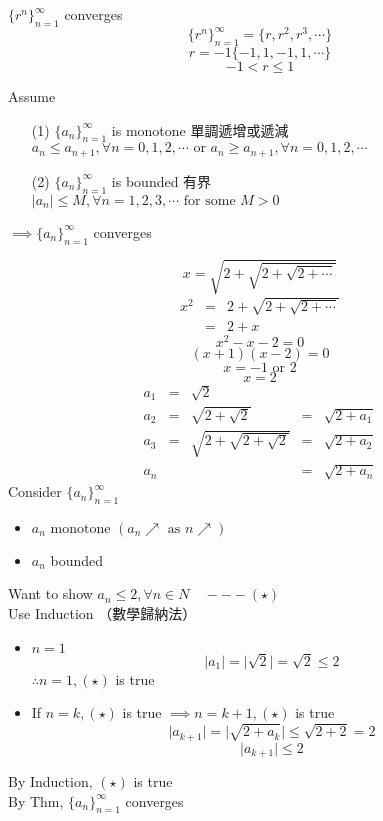 \begin{eg}
\(\{r^n\}^{\infty}_{n = 1}\) converges
\[\{r^n\}^{\infty}_{n = 1} = \{r, r^2, r^3, \cdots\}\]
\[r = -1 \{-1, 1, -1, 1, \cdots\}\]
\[-1 < r \leq 1\]
\end{eg}
\begin{theorem}
Assume
\begin{itemize}
\item[(1)] \(\{a_n\}^{\infty}_{n = 1}\) is monotone 單調遞增或遞減\\
\(a_n \leq a_{n + 1}, \forall n = 0, 1, 2, \cdots \text{ or } a_n \geq a_{n + 1}, \forall n = 0, 1, 2, \cdots\)
\item[(2)]\(\{a_n\}^{\infty}_{n = 1}\) is bounded 有界\\
\(\Big| a_n \Big| \leq M, \forall n = 1, 2, 3, \cdots \text{ for some } M > 0\)
\end{itemize}
\(\implies \{a_n\}^{\infty}_{n = 1}\) converges
\end{theorem}
\begin{eg}
\[x = \sqrt{2+ \sqrt{2+ \sqrt{2 + \cdots}}}\]
\[\begin{array}{rcl}
x^2 & = & 2 + \sqrt{2 + \sqrt{2 + \cdots}}\\
& = & 2 + x
\end{array}\]
\[x^2 -x - 2 = 0\]
\[(x + 1)(x -2) = 0\]
\[x = -1 \text{ or } 2\]
\[x = 2\]
\[\begin{array}{rclcl}
a_1 & = & \sqrt{2}\\
a_2 & = & \sqrt{2 + \sqrt{2}} & = & \sqrt{2 + a_1}\\
a_3 & = & \sqrt{2 + \sqrt{2 + \sqrt{2}}} & = & \sqrt{2 + a_2}\\
a_n &&& = & \sqrt{2 + a_n}
\end{array}\]
Consider \(\{a_n\}^{\infty}_{n = 1}\) 
\begin{itemize}
\item \(a_n \text{ monotone } (a_n \nearrow \text{ as } n \nearrow)\)
\item \(a_n\) bounded
\end{itemize}
Want to show \(a_n \leq 2, \forall n \in N \quad --- (\star)\)\\
Use Induction （數學歸納法）
\begin{itemize}
\item \(n = 1\)\\
\[\Big| a_1 \Big| = \Big| \sqrt{2} \Big| = \sqrt{2} \leq 2\]
\(\therefore n = 1, (\star)\) is true
\item If \(n = k, (\star)\) is true \(\implies n = k + 1, (\star)\) is true\\
\[\Big| a_{k + 1} \Big|= \Big| \sqrt{2 + a_k} \Big| \leq \sqrt{2 + 2} = 2\]
\[\Big| a_{k + 1} \Big| \leq 2\]
\end{itemize}
By Induction, \((\star)\) is true\\
By Thm, \(\{a_n\}^{\infty}_{n = 1}\) converges 
\end{eg}
